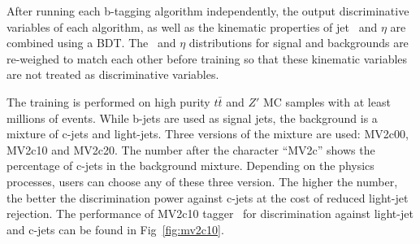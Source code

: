 \par After running each b-tagging algorithm independently, the output discriminative variables of each algorithm, as well as the kinematic properties of jet \pt~and $\eta$ are combined using a BDT. The \pt~and $\eta$ distributions for signal and backgrounds are re-weighed to match each other before training so that these kinematic variables are not treated as discriminative variables.
\par The training is performed on high purity $t\bar{t}$ and $Z'$ MC samples with at least millions of events. While b-jets are used as signal jets, 
the background is a mixture of c-jets and light-jets. Three versions of the mixture are used: MV2c00, MV2c10 and MV2c20. The number after the character ``MV2c''
shows the percentage of c-jets in the background mixture. Depending on the physics processes, users can choose any of these three version.
The higher the number, the better the discrimination power against c-jets at the cost of reduced light-jet rejection. 
The performance of MV2c10 tagger~\cite{Varni:2655785} for discrimination against light-jet and c-jets can be found in Fig~\ref{fig:mv2c10}.

